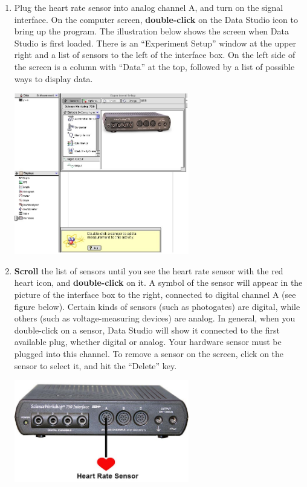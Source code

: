 \begin{enumerate}[label=\arabic*.]

\item Plug the heart rate sensor into analog channel A, and turn on the signal interface.  On the computer screen, \textbf{double-click } on the Data Studio icon to bring up the program.  The illustration below shows the screen when Data Studio is first loaded.  There is an ``Experiment Setup'' window at the upper right and a list of sensors to the left of the interface box.  On the left side of the screen is a column with ``Data'' at the top, followed by a list of possible ways to display data.
\begin{center} \includegraphics*[width=0.6\textwidth]{imgs/6labs/6Alab/6Aexp1/6A-Exp1_fig3.jpg} \end{center}

\item \textbf{Scroll} the list of sensors until you see the heart rate sensor with the red heart icon, and \textbf{double-click } on it.  A symbol of the sensor will appear in the picture of the interface box to the right, connected to digital channel A (see figure below).  Certain kinds of sensors (such as photogates) are digital, while others (such as voltage-measuring devices) are analog.  In general, when you double-click on a sensor, Data Studio will show it connected to the first available plug, whether digital or analog.  Your hardware sensor must be plugged into this channel.  To remove a sensor on the screen, click on the sensor to select it, and hit the ``Delete'' key.
\begin{center} \includegraphics*[width=0.6\textwidth]{imgs/6labs/6Alab/6Aexp1/6A-Exp1-fig4_new.jpg} \end{center}


\end{enumerate}
